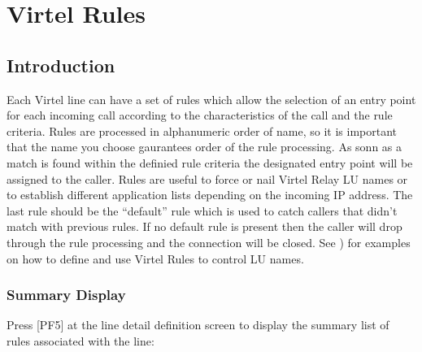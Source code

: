 \documentclass[letterpaper,10pt,english]{sphinxmanual}
\begin{document}
\ignorespaces 

\chapter{Virtel Rules}
\label{\detokenize{connectivity_guide:virtel-rules}}\label{\detokenize{connectivity_guide:v461cn-virtelrules}}\label{\detokenize{connectivity_guide:index-90}}

\section{Introduction}
\label{\detokenize{connectivity_guide:id43}}
\sphinxAtStartPar
Each Virtel line can have a set of rules which allow the selection of an entry point for each incoming call according to the characteristics of the call and the rule criteria. Rules are processed in alphanumeric order of name, so it is important that the name you choose gaurantees order of the rule processing. As sonn as a match is found within the definied rule criteria the designated entry point will be assigned to the caller. Rules are useful to force or nail Virtel Relay LU names or to establish different application lists depending on the incoming IP address. The last rule should be the “default” rule which is used to catch callers that didn’t match with previous rules. If no default rule is present then the caller will drop through the rule processing and the connection will be closed. See {\hyperref[\detokenize{connectivity_guide:v461cn-forceluname}]{}}) for examples on how to define and use Virtel Rules to control LU names.

\ignorespaces 

\subsection{Summary Display}
\label{\detokenize{connectivity_guide:index-91}}\label{\detokenize{connectivity_guide:id44}}
\sphinxAtStartPar
Press {[}PF5{]} at the line detail definition screen to display the summary list of rules associated with the line:

\sphinxAtStartPar
{}
\end{document}
